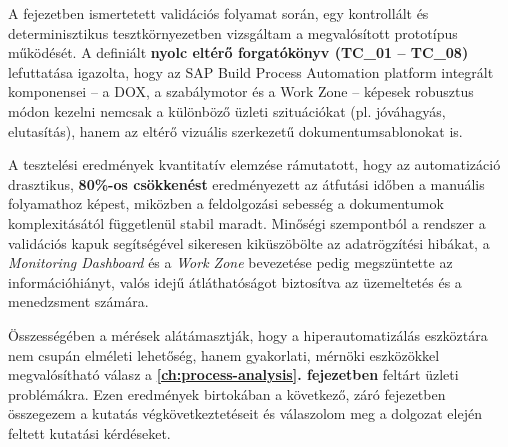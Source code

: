 A fejezetben ismertetett validációs folyamat során, egy kontrollált és determinisztikus tesztkörnyezetben vizsgáltam a megvalósított prototípus működését. A definiált \textbf{nyolc eltérő forgatókönyv (TC\_01 -- TC\_08)} lefuttatása igazolta, hogy az SAP Build Process Automation platform integrált komponensei – a DOX, a szabálymotor és a Work Zone – képesek robusztus módon kezelni nemcsak a különböző üzleti szituációkat (pl. jóváhagyás, elutasítás), hanem az eltérő vizuális szerkezetű dokumentumsablonokat is.

A tesztelési eredmények kvantitatív elemzése rámutatott, hogy az automatizáció drasztikus, \textbf{80\%-os csökkenést} eredményezett az átfutási időben a manuális folyamathoz képest, miközben a feldolgozási sebesség a dokumentumok komplexitásától függetlenül stabil maradt. Minőségi szempontból a rendszer a validációs kapuk segítségével sikeresen kiküszöbölte az adatrögzítési hibákat, a \textit{Monitoring Dashboard} és a \textit{Work Zone} bevezetése pedig megszüntette az információhiányt, valós idejű átláthatóságot biztosítva az üzemeltetés és a menedzsment számára.

Összességében a mérések alátámasztják, hogy a hiperautomatizálás eszköztára nem csupán elméleti lehetőség, hanem gyakorlati, mérnöki eszközökkel megvalósítható válasz a \textbf{\ref{ch:process-analysis}. fejezetben} feltárt üzleti problémákra. Ezen eredmények birtokában a következő, záró fejezetben összegezem a kutatás végkövetkeztetéseit és válaszolom meg a dolgozat elején feltett kutatási kérdéseket.